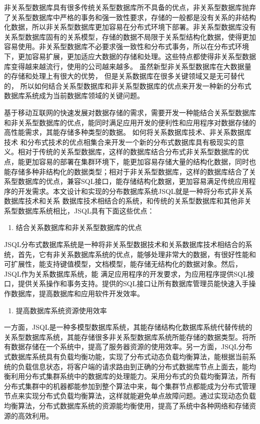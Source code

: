 非关系型数据库具有很多传统关系型数据库所不具备的优点，非关系型数据库抛弃了关系型数据库中严格的事务和强一致性要求，存储的一般都是没有关系的非结构化数据，所以非关系型数据库更加容易在分布式环境下部署。非关系型数据库没有关系型数据库固有的关系模型，存储的数据不局限于关系型结构化数据，使得更加容易使用。非关系型数据库不必要求强一致性和分布式事务，所以在分布式环境下，更加容易扩展，更加适应大数据的存储和处理。这些特点都使得非关系型数据库变得越来越流行，使用的公司越来越多。
虽然新型非关系型数据库在大数据量的存储和处理上有很大的优势，
但是关系数据库在很多关键领域又是无可替代的，
所以如何结合关系型数据库和非关系型数据库的优点来开发一种新的分布式数据库系统成为当前数据库领域的关键问题。

基于移动互联网的快速发展对数据存储的需求，需要开发一种能结合关系型数据库和非关系型数据库的优点，能同时满足应用开发的便利性和应用程序对数据存储的高性能需求，其能存储多种类型的数据。
如何将关系数据库技术、非关系数据库技术
和分布式技术的优点相集合来开发一个新的分布式数据库具有极现实的意义。相对于传统的关系型数据库，这样的数据库结合分布式非关系型数据库的优点，能更加容易的部署在集群环境下，能更加容易存储大量的结构化数据，同时也能存储多种非结构化的数据类型；相对于非关系型数据库，这样的数据库结合了关系型数据库的优点，兼容SQL接口，能存储结构化数据，更加容易满足传统应用程序的开发需求。本文设计和实现的分布数据库系统JSQL就是一种将分布式非关系数据库技术和关系
数据库技术相结合的系统，和传统的关系型数据库和其他非关系型数据库系统相比，JSQL具有下面这些优点：

\begin{enumerate}
	\item 结合关系数据库和非关系型数据库的优点
\end{enumerate}

	JSQL分布式数据库系统是一种将非关系型数据技术和关系数据库技术相结合的系统，首先，它有非关系数据库系统的优点，能够处理非常大的数据，有很好性能和可扩展性，能支持键值模型，文档模型，能存储无结构化的数据对象。然后，JSQL作为关系数据库系统，能
	满足应用程序的开发要求，为应用程序提供SQL接口，提供关系操作和事务支持。提供的SQL接口让所有数据库管理员能快速入手操作数据库，提高数据库和应用软件开发效率。
	
	\begin{enumerate}[resume]
		\item 提高数据库系统资源使用效率
	\end{enumerate}

一方面，JSQL是一种多模型数据库系统，其能存储结构化数据库系统代替传统的关系型数据库系统，其能存储很多非关系型数据库系统所能存储的数据类型。将所有数据存储在一个系统中，提高了服务器资源的使用效率。另一方面，JSQL分布式数据库系统具有负载均衡功能，实现了分布式动态负载均衡算法，能根据当前系统的负载信息状态，将客户端的请求路由到正确的分布式数据库节点上面去，能均衡利用分布式集群系统中的数据库的处理能力。采用分布式的负载均衡算法，所有分布式集群中的机器都能参加到整个算法中来，每个集群节点都能成为分布式管理节点来实现分布式负载均衡算法，这样就能避免单点故障问题。通过实现动态负载均衡算法，分布式数据库系统的资源能均衡使用，提高了系统中各种网络和存储资源的高效利用。
	
